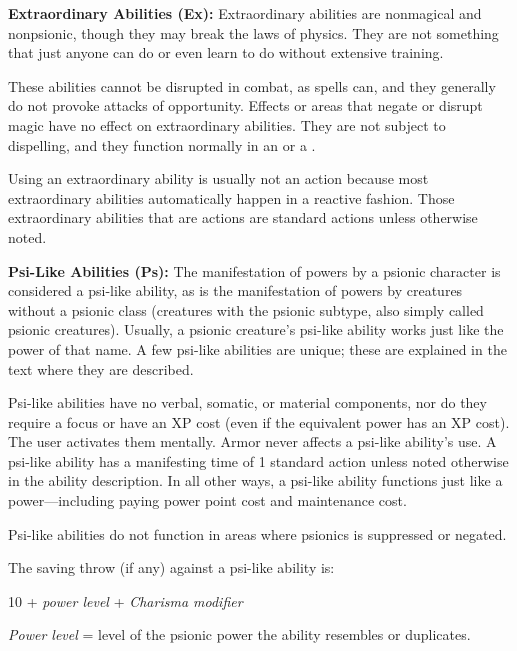 \textbf{Extraordinary Abilities (Ex):} Extraordinary abilities are nonmagical and nonpsionic, though they may break the laws of physics. They are not something that just anyone can do or even learn to do without extensive training.

These abilities cannot be disrupted in combat, as spells can, and they generally do not provoke attacks of opportunity. Effects or areas that negate or disrupt magic have no effect on extraordinary abilities. They are not subject to dispelling, and they function normally in an  or a .

Using an extraordinary ability is usually not an action because most extraordinary abilities automatically happen in a reactive fashion. Those extraordinary abilities that are actions are standard actions unless otherwise noted.

\textbf{Psi-Like Abilities (Ps):} The manifestation of powers by a psionic character is considered a psi-like ability, as is the manifestation of powers by creatures without a psionic class (creatures with the psionic subtype, also simply called psionic creatures). Usually, a psionic creature's psi-like ability works just like the power of that name. A few psi-like abilities are unique; these are explained in the text where they are described.

Psi-like abilities have no verbal, somatic, or material components, nor do they require a focus or have an XP cost (even if the equivalent power has an XP cost). The user activates them mentally. Armor never affects a psi-like ability's use. A psi-like ability has a manifesting time of 1 standard action unless noted otherwise in the ability description. In all other ways, a psi-like ability functions just like a power---including paying power point cost and maintenance cost. %

Psi-like abilities do not function in areas where psionics is suppressed or negated.

The saving throw (if any) against a psi-like ability is:

\begin{Formula*}{10 + \textit{power level} + \textit{Charisma modifier}}
	\item \textit{Power level} = level of the psionic power the ability resembles or duplicates.
\end{Formula*}

